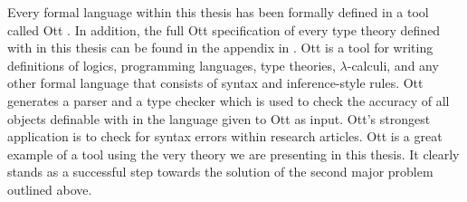 \documentclass[phd,dedicationpage,ackpage,epigraphpage,figures]{uithesis}
\begin{document}
Every formal language within this thesis has been formally defined in
a tool called Ott \cite{Sewell:2010}.  In addition, the full Ott
specification of every type theory defined with in this thesis can be
found in the appendix in \cite{Eades:2014-full}.  Ott is a tool for
writing definitions of logics, programming languages, type theories,
$\lambda$-calculi, and any other formal language that consists of
syntax and inference-style rules.  Ott generates a parser and a type
checker which is used to check the accuracy of all objects definable
with in the language given to Ott as input.  Ott's strongest
application is to check for syntax errors within research articles.
Ott is a great example of a tool using the very theory we are
presenting in this thesis.  It clearly stands as a successful step
towards the solution of the second major problem outlined above.
\end{document}
